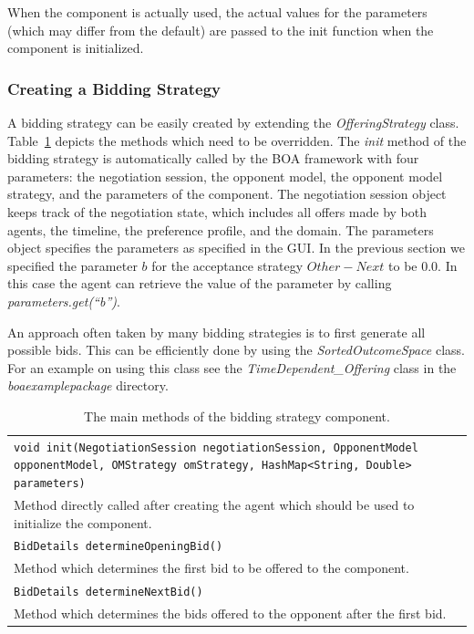 \documentclass[]{article}
\begin{document}
When the component is actually used, the actual values for the parameters (which may differ from the default) are passed to the init function when the component is initialized.

\subsubsection{Creating a Bidding Strategy}
A bidding strategy can be easily created by extending the \textit{OfferingStrategy} class. Table~\ref{tab:BOAbs} depicts the methods which need to be overridden. The \textit{init} method of the bidding strategy is automatically called by the BOA framework with four parameters: the negotiation session, the opponent model, the opponent model strategy, and the parameters of the component. The negotiation session object keeps track of the negotiation state, which includes all offers made by both agents, the timeline, the preference profile, and the domain. The parameters object specifies the parameters as specified in the GUI. In the previous section we specified the parameter $b$ for the acceptance strategy $Other - Next$ to be 0.0. In this case the agent can retrieve the value of the parameter by calling \textit{parameters.get(``b'')}.

An approach often taken by many bidding strategies is to first generate all possible bids. This can be efficiently done by using the \textit{SortedOutcomeSpace} class. For an example on using this class see the \textit{TimeDependent\_Offering} class in the \textit{boaexamplepackage} directory.

\begin{table}[h]
\begin{tabular}{m{}}
\hline
\texttt{void init(NegotiationSession negotiationSession, OpponentModel opponentModel, 
						OMStrategy omStrategy, HashMap<String, Double> parameters)}\\
Method directly called after creating the agent which should be used to initialize the component.\\
\hline
\texttt{BidDetails determineOpeningBid()}\\
Method which determines the first bid to be offered to the component.\\
\hline
\texttt{BidDetails determineNextBid()}\\
Method which determines the bids offered to the opponent after the first bid.\\
\hline
\end{tabular}
\caption{The main methods of the bidding strategy component.}
\label{tab:BOAbs}
\end{table}
\end{document}
